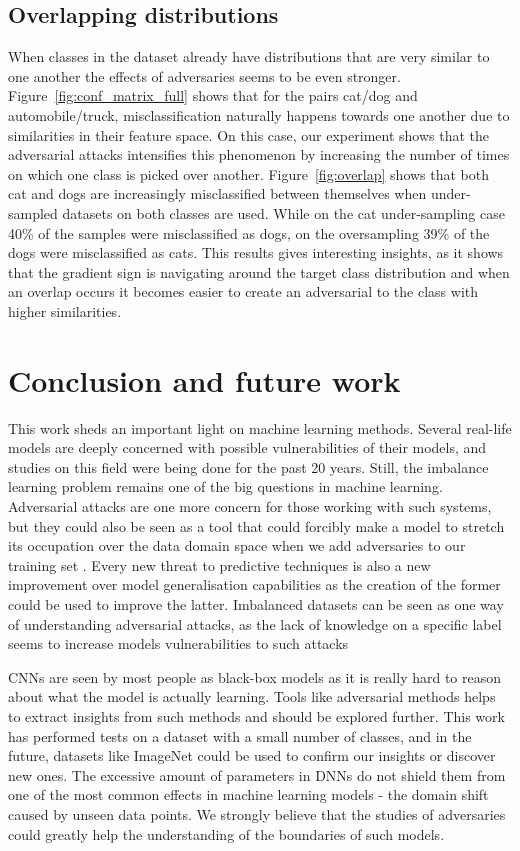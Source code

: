 \documentclass[runningheads,a4paper]{llncs}
\begin{document}
\subsection{Overlapping distributions}

When classes in the dataset already have distributions that are very similar to one another the effects of adversaries seems to be even stronger. Figure~\ref{fig:conf_matrix_full} shows that for the pairs cat/dog and automobile/truck, misclassification naturally happens towards one another due to similarities in their feature space. On this case, our experiment shows that the adversarial attacks intensifies this phenomenon by increasing the number of times on which one class is picked over another. Figure~\ref{fig:overlap} shows that both cat and dogs are increasingly misclassified between themselves when under-sampled datasets on both classes are used. While on the cat under-sampling case 40\% of the samples were misclassified as dogs, on the oversampling 39\% of the dogs were misclassified as cats. This results gives interesting insights, as it shows that the gradient sign is navigating around the target class distribution and when an overlap occurs it becomes easier to create an adversarial to the class with higher similarities.


\section{Conclusion and future work}

This work sheds an important light on machine learning methods. Several real-life models are deeply concerned with possible vulnerabilities of their models, and studies on this field were being done for the past 20 years. Still, the imbalance learning problem remains one of the big questions in machine learning. Adversarial attacks are one more concern for those working with such systems, but they could also be seen as a tool that could forcibly make a model to stretch its occupation over the data domain space when we add adversaries to our training set \cite{goodfellow2016}. Every new threat to predictive techniques is also a new improvement over model generalisation capabilities as the creation of the former could be used to improve the latter. Imbalanced datasets can be seen as one way of understanding adversarial attacks, as the lack of knowledge on a specific label seems to increase models vulnerabilities to such attacks

CNNs are seen by most people as black-box models as it is really hard to reason about what the model is actually learning. Tools like adversarial methods helps to extract insights from such methods and should be explored further. This work has performed tests on a dataset with a small number of classes, and in the future, datasets like ImageNet could be used to confirm our insights or discover new ones. The excessive amount of parameters in DNNs do not shield them from one of the most common effects in machine learning models - the domain shift caused by unseen data points. We strongly believe that the studies of adversaries could greatly help the understanding of the boundaries of such models.


 

\end{document}

